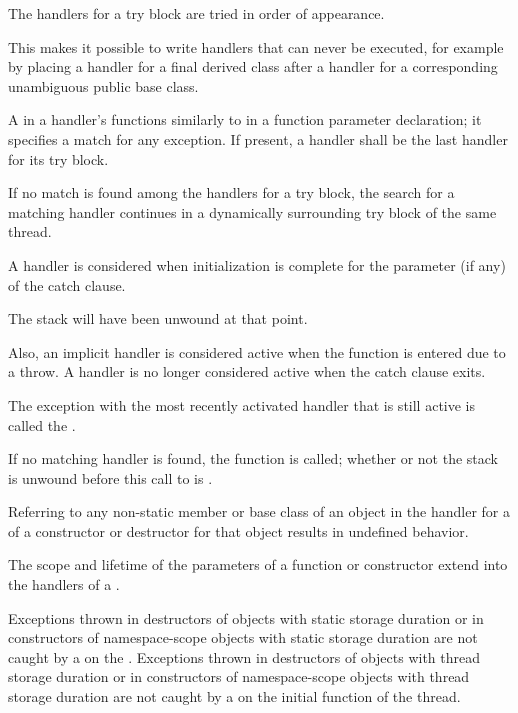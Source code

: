 \pnum
The handlers for a try block are tried in order of appearance.
\begin{note}
This makes it possible to write handlers that can never be
executed, for example by placing a handler for a final derived class after
a handler for a corresponding unambiguous public base class.
\end{note}

\pnum
A
in a handler's
functions similarly to
in a function parameter declaration;
it specifies a match for any exception.
If present, a
handler shall be the last handler for its try block.

\pnum
If no match is found among the handlers for a try block,
the search for a matching
handler continues in a dynamically surrounding try block
of the same thread.

\pnum
A handler is considered  when
initialization is complete for the parameter (if any) of the catch clause.
\begin{note}
The stack will have been unwound at that point.
\end{note}
Also, an implicit handler is considered active when
the function 
is entered due to a throw. A handler is no longer considered active when the
catch clause exits.

\pnum
{}%
The exception with the most recently activated handler that is
still active is called the
.

\pnum
If no matching handler is found,
the function
is called;
whether or not the stack is unwound before this call to
is .

\pnum
Referring to any non-static member or base class of an object
in the handler for a
of a constructor or destructor for that object results in undefined behavior.

\pnum
The scope and lifetime of the parameters of a function or constructor
extend into the handlers of a
.

\pnum
Exceptions thrown in destructors of objects with static storage duration or in
constructors of namespace-scope objects with static storage duration are not caught by a
on
the .
Exceptions thrown in destructors of objects with thread storage duration or in constructors of namespace-scope objects with thread storage duration are not caught by a
on the initial function of the thread.

